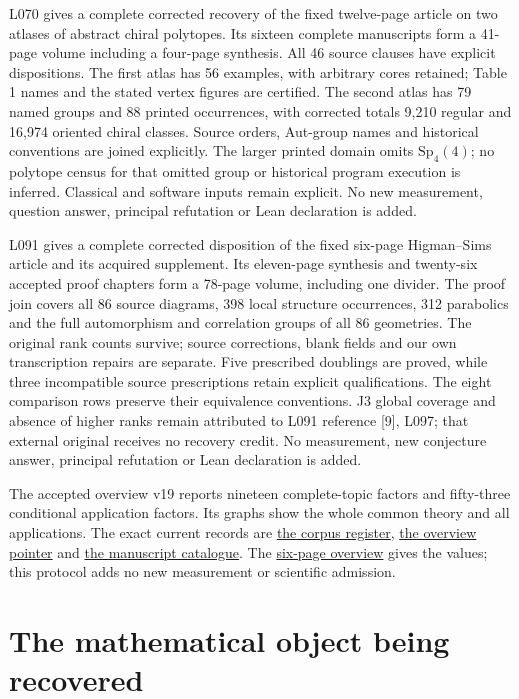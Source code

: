 \documentclass[11pt,a4paper]{article}
\begin{document}
L070 gives a complete corrected recovery of the fixed twelve-page article
on two atlases of abstract chiral polytopes. Its sixteen complete manuscripts
form a 41-page volume including a four-page synthesis. All 46 source clauses
have explicit dispositions. The first atlas has 56 examples, with arbitrary
cores retained; Table 1 names and the stated vertex figures are certified.
The second atlas has 79 named groups and 88 printed occurrences, with corrected
totals 9,210 regular and 16,974 oriented chiral classes. Source orders, Aut-group
names and historical conventions are joined explicitly. The larger printed
domain omits $\mathrm{Sp}_4(4)$; no polytope census for that omitted group or
historical program execution is inferred. Classical and software inputs
remain explicit. No new measurement, question answer, principal refutation
or Lean declaration is added.

L091 gives a complete corrected disposition of the fixed six-page
Higman--Sims article and its acquired supplement. Its eleven-page synthesis and
twenty-six accepted proof chapters form a 78-page volume, including one divider.
The proof join covers all 86 source diagrams, 398 local structure occurrences,
312 parabolics and the full automorphism and correlation groups of all 86
geometries. The original rank
counts survive; source corrections, blank fields and our own transcription
repairs are separate. Five prescribed doublings are proved, while three
incompatible source prescriptions retain explicit qualifications. The eight
comparison rows preserve their equivalence conventions. J3 global coverage
and absence of higher ranks remain attributed to L091 reference [9], L097;
that external original receives no recovery credit. No measurement, new
conjecture answer, principal refutation or Lean declaration is added.

The accepted overview v19 reports nineteen complete-topic factors and fifty-three
conditional application factors. Its graphs show the whole common theory and
all applications. The exact current records are
\href{corpus/latest.json}{the corpus register},
\href{overview/latest.json}{the overview pointer} and
\href{../papers/latest_catalogue.json}{the manuscript catalogue}.
The \href{overview/v19/packet/reader.pdf}{six-page overview} gives the values;
this protocol adds no new measurement or scientific admission.

\section{The mathematical object being recovered}
\end{document}
